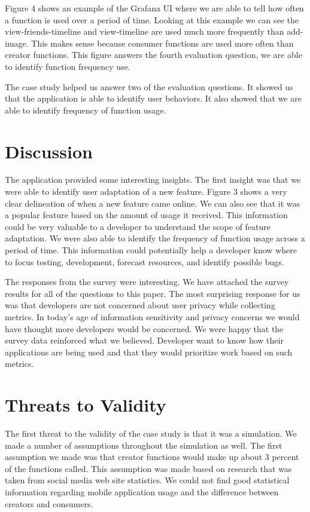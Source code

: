 Figure 4 shows an example of the Grafana UI where we are able to tell how often a function is used over a period of time. Looking at this example we can see the view-friends-timeline and view-timeline are used much more frequently than add-image. This makes sense because consumer functions are used more often than creator functions. This figure answers the fourth evaluation question, we are able to identify function frequency use. 

The case study helped us answer two of the evaluation questions. It showed us that the application is able to identify user behaviors. It also showed that we are able to identify frequency of function usage.

\section{Discussion}
The application provided some interesting insights. The first insight was that we were able to identify user adaptation of a new feature. Figure 3 shows a very clear delineation of when a new feature came online. We can also see that it was a popular feature based on the amount of usage it received. This information could be very valuable to a developer to understand the scope of feature adaptation. We were also able to identify the frequency of function usage across a period of time. This information could potentially help a developer know where to focus testing, development, forecast resources, and identify possible bugs. 

The responses from the survey were interesting. We have attached the survey results for all of the questions to this paper. The most surprising response for us was that developers are not concerned about user privacy while collecting metrics. In today’s age of information sensitivity and privacy concerns we would have thought more developers would be concerned. We were happy that the survey data reinforced what we believed. Developer want to know how their applications are being used and that they would prioritize work based on such metrics. 

\section{Threats to Validity}
The first threat to the validity of the case study is that it was a simulation. We made a number of assumptions throughout the simulation as well.  The first assumption we made was that creator functions would make up about 3 percent of the functions called. This assumption was made based on research that was taken from social media web site statistics. We could not find good statistical information regarding mobile application usage and the difference between creators and consumers. 

